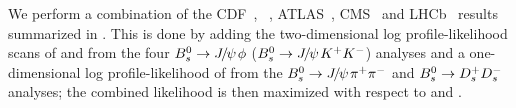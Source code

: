 We perform a combination of the CDF~\cite{Aaltonen:2012ie,*CDF:2011af,*Aaltonen:2007he_mod,*Aaltonen:2007gf_mod},
\dzero~\cite{Abazov:2011ry,*Abazov_mod:2008fj,*Abazov:2007tx_mod_cont},
ATLAS~\cite{Aad:2014cqa,*Aad:2012kba_cont}, CMS~\cite{CMS-PAS-BPH-13-012}
and LHCb~\cite{LHCB-PAPER-2014-059,*Aaij:2013oba_supersede2,Aaij:2014dka,*Aaij:2013oba_supersede}
results summarized in .
This is done by adding the two-dimensional log profile-likelihood scans of
\DGs and \phiccbars from the four $B^0_s\to{J\mskip -3mu/\mskip -2mu\psi\mskip 2mu}\phi$ ($B^0_s\to{J\mskip -3mu/\mskip -2mu\psi\mskip 2mu} K^+K^-$) analyses and 
a one-dimensional log profile-likelihood of \phiccbars
from the $B^0_s\to{J\mskip -3mu/\mskip -2mu\psi\mskip 2mu}\pi^+\pi^-$ and $B^0_s \to D_s^+ D_s^-$ analyses; 
the combined likelihood is then maximized with respect to \DGs and \phiccbars.

